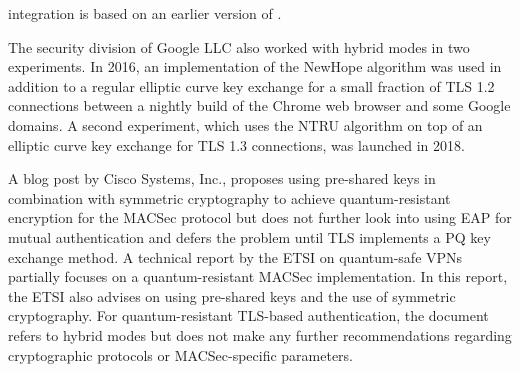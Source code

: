 integration is based on an earlier version of \cite{ietf-tls-hybrid-design-02}.

The security division of Google LLC also worked with hybrid modes in two experiments. In 2016, an implementation of the NewHope algorithm was used in addition to a regular elliptic curve key exchange for a small fraction of TLS 1.2 connections between a nightly build of the Chrome web browser and some Google domains\cite{cecpq1}. A second experiment, which uses the NTRU algorithm on top of an elliptic curve key exchange for TLS 1.3 connections, was launched in 2018\cite{cecpq2}.

A blog post by Cisco Systems, Inc., proposes using pre-shared keys in combination with symmetric cryptography to achieve quantum-resistant encryption for the MACSec protocol but does not further look into using \ac{EAP} for mutual authentication and defers the problem until TLS implements a \ac{PQ} key exchange method\cite{ciscopqmacsec}. A technical report by the \ac{ETSI} on quantum-safe \acp{VPN} partially focuses on a quantum-resistant MACSec implementation. In this report, the \ac{ETSI} also advises on using pre-shared keys and the use of symmetric cryptography. For quantum-resistant TLS-based authentication, the document refers to hybrid modes but does not make any further recommendations regarding cryptographic protocols or MACSec-specific parameters. 

\endinput